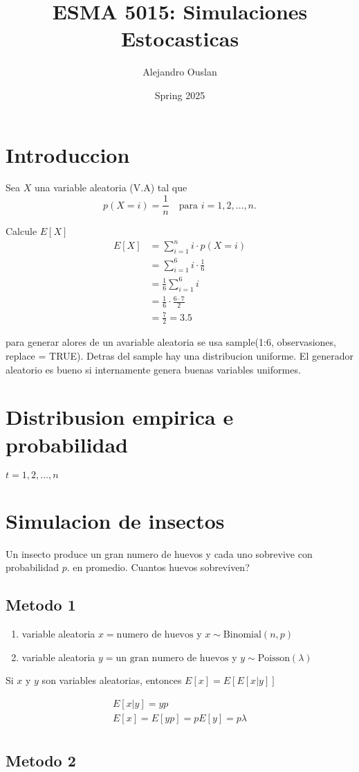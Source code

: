 \documentclass[10pt, oneside]{article}
\title{ESMA 5015: Simulaciones Estocasticas}
\author{Alejandro Ouslan}
\date{Spring 2025}
\begin{document}
\maketitle
\tableofcontents

\vspace{.25in}

\section{Introduccion}

Sea $X$ una variable aleatoria (V.A) tal que
$$ p(X = i) = \frac{1}{n} \quad \text{para } i = 1, 2, \ldots, n. $$

Calcule $E[X]$
\[
	\begin{split}
		E[X] & = \sum_{i=1}^{n} i \cdot p(X = i)       \\
		& = \sum_{i=1}^{6} i \cdot \frac{1}{6}    \\
		& = \frac{1}{6} \sum_{i=1}^{6} i          \\
		& = \frac{1}{6} \cdot \frac{6 \cdot 7}{2} \\
		& = \frac{7}{2} = 3.5
	\end{split}
\]

para generar alores de un avariable aleatoria se usa sample(1:6, observasiones, replace = TRUE). Detras del sample hay una distribucion uniforme.
El generador aleatorio es bueno si internamente genera buenas variables uniformes.

\section{Distribusion empirica e probabilidad}

$t = 1, 2, \ldots, n$


\section{Simulacion de insectos}

Un insecto produce un gran numero de huevos y cada uno sobrevive con probabilidad $p$. en promedio. Cuantos huevos sobreviven?

\subsection{Metodo 1}

\begin{enumerate}
	\item variable aleatoria $x = \text{numero de huevos}$ y $x \sim \text{Binomial}(n, p)$
	\item variable aleatoria $y= \text{un gran numero de huevos}$ y $y \sim \text{Poisson}(\lambda)$
\end{enumerate}

Si $x$ y $y$ son variables aleatorias, entonces $E[x] = E[E[x|y]]$

\[
	\begin{split}
		E[x|y] = yp \\
		E[x] = E[yp] = pE[y] = p\lambda \\
	\end{split}
\]

\subsection{Metodo 2}
\end{document}
